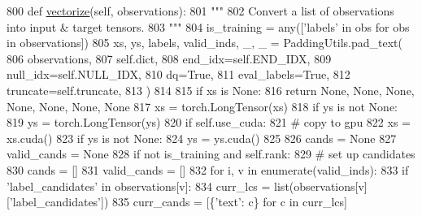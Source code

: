 \begin{DoxyCode}
800     \textcolor{keyword}{def }\hyperlink{namespaceparlai_1_1agents_1_1drqa_1_1utils_a5c76cc39e3014c7bcf9199d566dbdc0f}{vectorize}(self, observations):
801         \textcolor{stringliteral}{"""}
802 \textcolor{stringliteral}{        Convert a list of observations into input & target tensors.}
803 \textcolor{stringliteral}{        """}
804         is\_training = any([\textcolor{stringliteral}{'labels'} \textcolor{keywordflow}{in} obs \textcolor{keywordflow}{for} obs \textcolor{keywordflow}{in} observations])
805         xs, ys, labels, valid\_inds, \_, \_ = PaddingUtils.pad\_text(
806             observations,
807             self.dict,
808             end\_idx=self.END\_IDX,
809             null\_idx=self.NULL\_IDX,
810             dq=\textcolor{keyword}{True},
811             eval\_labels=\textcolor{keyword}{True},
812             truncate=self.truncate,
813         )
814 
815         \textcolor{keywordflow}{if} xs \textcolor{keywordflow}{is} \textcolor{keywordtype}{None}:
816             \textcolor{keywordflow}{return} \textcolor{keywordtype}{None}, \textcolor{keywordtype}{None}, \textcolor{keywordtype}{None}, \textcolor{keywordtype}{None}, \textcolor{keywordtype}{None}, \textcolor{keywordtype}{None}, \textcolor{keywordtype}{None}
817         xs = torch.LongTensor(xs)
818         \textcolor{keywordflow}{if} ys \textcolor{keywordflow}{is} \textcolor{keywordflow}{not} \textcolor{keywordtype}{None}:
819             ys = torch.LongTensor(ys)
820         \textcolor{keywordflow}{if} self.use\_cuda:
821             \textcolor{comment}{# copy to gpu}
822             xs = xs.cuda()
823             \textcolor{keywordflow}{if} ys \textcolor{keywordflow}{is} \textcolor{keywordflow}{not} \textcolor{keywordtype}{None}:
824                 ys = ys.cuda()
825 
826         cands = \textcolor{keywordtype}{None}
827         valid\_cands = \textcolor{keywordtype}{None}
828         \textcolor{keywordflow}{if} \textcolor{keywordflow}{not} is\_training \textcolor{keywordflow}{and} self.rank:
829             \textcolor{comment}{# set up candidates}
830             cands = []
831             valid\_cands = []
832             \textcolor{keywordflow}{for} i, v \textcolor{keywordflow}{in} enumerate(valid\_inds):
833                 \textcolor{keywordflow}{if} \textcolor{stringliteral}{'label\_candidates'} \textcolor{keywordflow}{in} observations[v]:
834                     curr\_lcs = list(observations[v][\textcolor{stringliteral}{'label\_candidates'}])
835                     curr\_cands = [\{\textcolor{stringliteral}{'text'}: c\} \textcolor{keywordflow}{for} c \textcolor{keywordflow}{in} curr\_lcs]

\end{DoxyCode}

